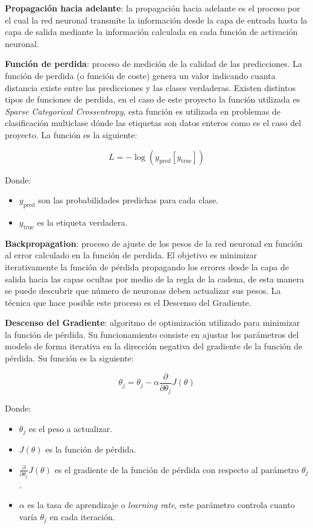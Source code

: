 \textbf{Propagación hacia adelante}: la propagación hacia adelante es el proceso por el cual la red neuronal transmite la información desde la capa de entrada hasta la capa de salida mediante la información calculada en cada función de activación neuronal.

\textbf{Función de perdida}: proceso de medición de la calidad de las predicciones. La función de perdida (o función de coste) genera un valor indicando cuanta distancia existe entre las predicciones y las clases verdaderas. Existen distintos tipos de funciones de perdida, en el caso de este proyecto la función utilizada es \textit{Sparse Categorical Crossentropy}, esta función es utilizada en problemas de clasificación multiclase dónde las etiquetas son datos enteros como es el caso del proyecto. \cite{Koech_2022}
La función es la siguiente:

\begin{equation}
L = - \log(y_{\mathrm{pred}}[y_{\mathrm{true}}])
\end{equation}

Donde:
\begin{itemize}
\tightlist
\item $y_{\mathrm{pred}}$ son las probabilidades predichas para cada clase.
\item $y_{\mathrm{true}}$ es la etiqueta verdadera.
\end{itemize}

\textbf{Backpropagation}: proceso de ajuste de los pesos de la red neuronal en función al error calculado en la función de perdida. El objetivo es minimizar iterativamente la función de pérdida propagando los errores desde la capa de salida hacia las capas ocultas por medio de la regla de la cadena, de esta manera se puede descubrir que número de neuronas deben actualizar sus pesos. La técnica que hace posible este proceso es el Descenso del Gradiente. 

\textbf{Descenso del Gradiente}: algoritmo de optimización utilizado para minimizar la función de pérdida. Su funcionamiento consiste en ajustar los parámetros del modelo de forma iterativa en la dirección negativa del gradiente de la función de pérdida. Su función es la siguiente:

\begin{equation}
\theta_{j} = \theta_{j} - \alpha \frac{\partial}{\partial \theta_{j}} J(\theta)
\end{equation}

Donde:
\begin{itemize}
\tightlist
\item $\theta_{j}$ es el peso a actualizar.
\item $J(\theta)$ es la función de pérdida.
\item $\frac{\partial}{\partial \theta_{j}} J(\theta)$ es el gradiente de la función de pérdida con respecto al parámetro $\theta_{j}$.
\item $\alpha$ es la tasa de aprendizaje o \textit{learning rate}, este parámetro controla cuanto varía $\theta_{j}$ en cada iteración.
\end{itemize}

